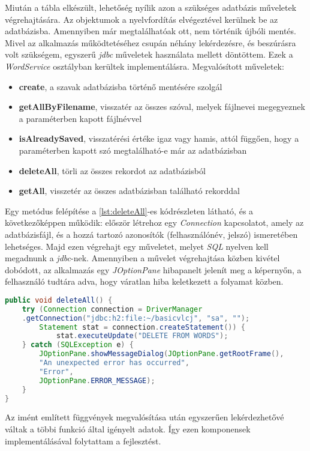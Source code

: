 Miután a tábla elkészült, lehetőség nyílik azon a szükséges adatbázis műveletek végrehajtására. Az objektumok a nyelvfordítás elvégeztével kerülnek be az adatbázisba. Amennyiben már megtalálhatóak ott, nem történik újbóli mentés. Mivel az alkalmazás működtetéséhez csupán néhány lekérdezésre, és beszúrásra volt szükségem, egyszerű \textit{jdbc} műveletek használata mellett döntöttem. Ezek a \textit{WordService} osztályban kerültek implementálásra. Megvalósított műveletek:
\begin{itemize}
\item \textbf{create}, a szavak adatbázisba történő mentésére szolgál
\item \textbf{getAllByFilename}, visszatér az összes szóval, melyek fájlnevei megegyeznek a paraméterben kapott fájlnévvel
\item \textbf{isAlreadySaved}, visszatérési értéke igaz vagy hamis, attól függően, hogy a paraméterben kapott szó megtalálható-e már az adatbázisban
\item \textbf{deleteAll}, törli az összes rekordot az adatbázisból
\item \textbf{getAll}, visszetér az összes adatbázisban található rekorddal
\end{itemize}
Egy metódus felépítése a \ref{lst:deleteAll}-es kódrészleten látható, és a következőképpen működik: először létrehoz egy \textit{Connection} kapcsolatot, amely az adatbázisfájl, és a hozzá tartozó azonosítók (felhasználónév, jelszó) ismeretében lehetséges. Majd ezen végrehajt egy műveletet, melyet \textit{SQL} nyelven kell megadnunk a \textit{jdbc}-nek. Amennyiben a művelet végrehajtása közben kivétel dobódott, az alkalmazás egy \textit{JOptionPane} hibapanelt jelenít meg a képernyőn, a felhasználó tudtára adva, hogy váratlan hiba keletkezett a folyamat közben.


\begin{spacing}{1.25}
\begin{lstlisting}[caption=Implementált deleteAll metódus, language=java, label={lst:deleteAll}, ]
public void deleteAll() {
    try (Connection connection = DriverManager
    .getConnection("jdbc:h2:file:~/basicvlcj", "sa", "");
        Statement stat = connection.createStatement()) {
            stat.executeUpdate("DELETE FROM WORDS");
    } catch (SQLException e) {
        JOptionPane.showMessageDialog(JOptionPane.getRootFrame(),
        "An unexpected error has occurred",
        "Error",
        JOptionPane.ERROR_MESSAGE);
    }
}
\end{lstlisting}
\end{spacing}

Az imént említett függvények megvalósítása után egyszerűen lekérdezhetővé váltak a többi funkció által igényelt adatok. Így ezen komponensek implementálásával folytattam a fejlesztést.